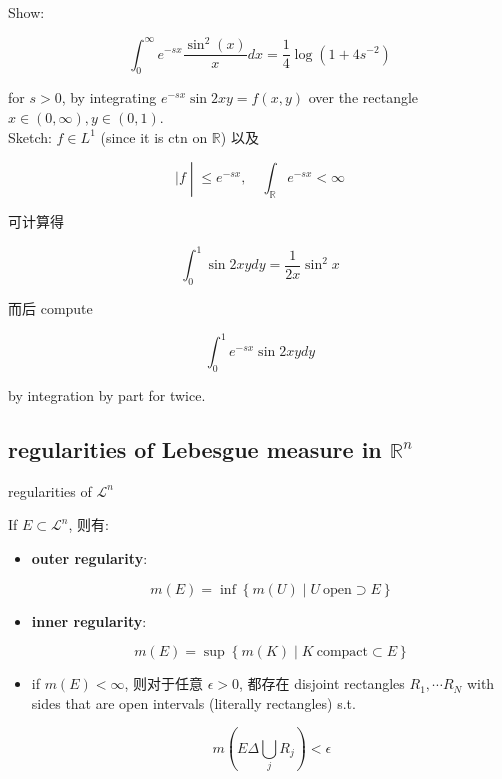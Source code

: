 \documentclass{qlnotes-export}
\begin{document}
\begin{example}\label{ex-07-lebesgue-measure-on-r-n-example-001}

Show:

\[\int_{0}^{\infty}e^{- sx}\frac{\sin^{2}(x)}{x} dx = \frac{1}{4}\log(1 + 4s^{- 2})\]

for \(s > 0\), by integrating \(e^{- sx}\sin 2xy = f(x,y)\) over the rectangle \(x \in (0,\infty),y \in (0,1)\).\\
Sketch: \(f \in L^{1}\) (since it is ctn on \(\mathbb{R}\)) 以及

\[\left. |f \middle| \leq e^{- sx},\quad\int_{\mathbb{R}}e^{- sx} < \infty \right.\]

可计算得

\[\int_{0}^{1}\sin 2xy dy = \frac{1}{2x}\sin^{2}x\]

而后 compute

\[\int_{0}^{1}e^{- sx}\sin 2xy dy\]

by integration by part for twice.

\end{example}

\subsection{\texorpdfstring{regularities of Lebesgue measure in \({\mathbb{R}}^{n}\)}{regularities of Lebesgue measure in \{\textbackslash mathbb\{R\}\}\^{}\{n\}}}\label{regularities-of-lebesgue-measure-in-mathbbrn}

\begin{theorem}{regularities of \(\mathcal{L}^{n}\)}\label{thm-07-lebesgue-measure-on-r-n-regularities-of-mathcal-l-n}

If \(E \subset \mathcal{L}^{n}\), 则有:

\begin{itemize}
\item
  \textbf{outer regularity}:

  \[m(E) = \inf\left\{ {m(U) \mid U\ \text{open} \supset E} \right\}\]
\item
  \textbf{inner regularity}:

  \[m(E) = \sup\left\{ {m(K) \mid K\ \text{compact} \subset E} \right\}\]
\item
  if \(m(E) < \infty\), 则对于任意 \(\epsilon > 0\), 都存在 disjoint rectangles \(R_{1},\cdots R_{N}\) with sides that are open intervals (literally rectangles) s.t.

  \[m(E\Delta\bigcup\limits_{j}R_{j}) < \epsilon\]
\end{itemize}

\end{theorem}
\end{document}
